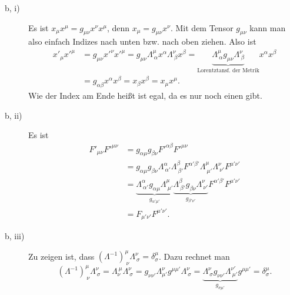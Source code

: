 \begin{description}
	\item[b, i)] Es ist $x_\mu x^\mu = g_{\mu \nu} x^\nu x^\mu$, denn $x_\mu = g_{\mu \nu} x^\nu$. Mit dem Tensor $g_{\mu \nu}$ kann man also einfach Indizes nach unten bzw. nach oben ziehen. Also ist
	\begin{align*}
		x'_\mu x'^\mu 
		&= g_{\mu \nu} x'^\nu x'^\mu 
		= g_{\mu \nu} \Lambda^\mu_{~\alpha} x^\alpha \Lambda^\nu_{~\beta} x^\beta
		= \underbrace{\Lambda^\mu_{~\alpha} g_{\mu \nu} \Lambda^\nu_{~\beta}}_{\text{Lorentztansf. der Metrik}} x^\alpha x^\beta \\
		&= g_{\alpha \beta} x^\alpha x^\beta = x_\beta x^\beta = x_\mu x^\mu
		\text{.}
	\end{align*}
	Wie der Index am Ende heißt ist egal, da es nur noch einen gibt.
	
	\item[b, ii)] Es ist 
	\begin{align*}
		F'_{\mu \nu} F'^{\mu \nu} 
		&= g_{\alpha \mu} g_{\beta \nu} F'^{\alpha \beta} F'^{\mu \nu} \\
		&= g_{\alpha \mu} g_{\beta \nu} \Lambda^\alpha_{~\alpha'} \Lambda^\beta_{~\beta'} F^{\alpha' \beta'} \Lambda^\mu_{~\mu'} \Lambda^\nu_{~\nu'} F^{\mu' \nu'} \\
		&= \underbrace{\Lambda^\alpha_{~\alpha'} g_{\alpha \mu} \Lambda^\mu_{~\mu'}}_{g_{\alpha' \mu'}} \underbrace{\Lambda^\beta_{~\beta'} g_{\beta \nu} \Lambda^\nu_{~\nu'}}_{g_{\beta' \nu'}} F^{\alpha' \beta'} F^{\mu' \nu'} \\
		&= F_{\mu' \nu'} F^{\mu' \nu'}
		\text{.}
	\end{align*}
	
	\item[b, iii)] Zu zeigen ist, dass $\left( \Lambda^{-1} \right)^\mu_{~\nu} \Lambda^\nu_{~\sigma} = \delta^\mu_\sigma$. Dazu rechnet man
	\[
		\left( \Lambda^{-1} \right)^\mu_{~\nu} \Lambda^\nu_{~\sigma}
		= \Lambda_\nu^{~\mu} \Lambda^\nu_{~\sigma}
		= g_{\nu \nu'} \Lambda^\nu_{\mu'} g^{\mu \mu'} \Lambda^\nu_{~\sigma}
		= \underbrace{\Lambda^\nu_{~\sigma} g_{\nu \nu'} \Lambda^{\nu'}_{~\mu'}}_{g_{\sigma \mu'}} g^{\mu \mu'}
		= \delta^\mu_\sigma
		\text{.}
	\]
\end{description}